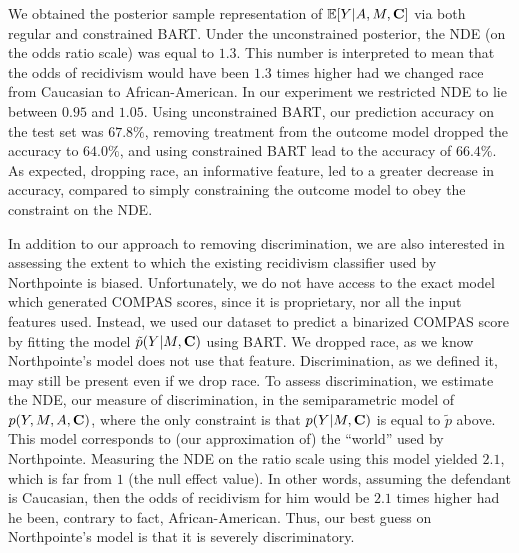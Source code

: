 \documentclass[letterpaper]{article} %
\newcommand{\citep}{\cite}
\begin{document}
We obtained the posterior sample representation of $\mathbb{E}[Y | A,M,{\bf C}]$ via both regular and constrained BART.
Under the unconstrained posterior, the NDE (on the odds ratio scale) was equal to $1.3$.  This number is interpreted to mean that
the odds of recidivism would have been $1.3$ times higher had we
changed race from Caucasian to African-American. 
In our experiment we restricted NDE to lie between $0.95$ and $1.05$. Using unconstrained BART, our prediction accuracy on the test set was $67.8 \%$,  removing treatment from the outcome model dropped the accuracy to $64.0\%$, and using constrained BART lead to the accuracy of $66.4\%$. As expected, dropping race, an informative feature, led to a greater decrease in accuracy, compared to simply constraining the outcome model to obey the constraint on the NDE.

In addition to our approach to removing discrimination, we are also interested in assessing the extent to which the existing recidivism classifier used by Northpointe is biased. Unfortunately, we do not have access to the exact model which generated COMPAS scores, since it is proprietary, nor all the input features used. Instead, we used our dataset to predict a binarized COMPAS score by fitting the model $\tilde{p}(Y | M,{\bf C})$ using BART.  We dropped race, as we know Northpointe's model does not use that feature. Discrimination, as we defined it, may still be present even if we drop race.  To assess discrimination, we estimate the NDE, our measure of discrimination, in the semiparametric model of $p(Y,M,A,{\bf C})$, where the only constraint is that $p(Y | M,{\bf C})$ is equal to $\tilde{p}$ above.  This model corresponds to (our approximation of) the ``world'' used by Northpointe.  Measuring the NDE on the ratio scale using this model yielded $2.1$, which is far from $1$ (the null effect value). In other words, assuming the defendant is Caucasian, then the odds of recidivism for him would be $2.1$ times higher had he been, contrary to fact, African-American. Thus, our best guess on Northpointe's model is that it is severely discriminatory. 
 
\end{document}
